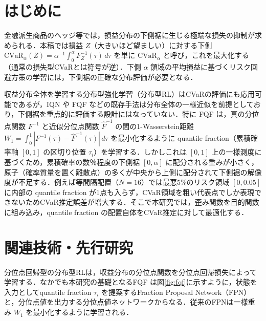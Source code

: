 \documentclass[a4paper,twocolumn,10pt]{jsarticle}
\newcommand{\CVaR}{\mathrm{CVaR}}
\begin{document}

\section{はじめに}
金融派生商品のヘッジ等では，損益分布の下側裾に生じる極端な損失の抑制が求められる．本稿では損益 $Z$（大きいほど望ましい）に対する下側 $\CVaR_\alpha(Z) = \alpha^{-1}\int_0^\alpha F_Z^{-1}(\tau)\,d\tau$ \cite{rockafellar} を単に $\CVaR_\alpha$ と呼び，これを最大化する（通常の損失型CVaRとは符号が逆）．下側 $\alpha$ 領域の平均損益に基づくリスク回避方策の学習には，下側裾の正確な分布評価が必要となる．

収益分布全体を学習する分布型強化学習（分布型RL）はCVaRの評価にも応用可能であるが，IQN \cite{iqn} や FQF \cite{fqf} などの既存手法は分布全体の一様近似を前提としており，下側裾を重点的に評価する設計にはなっていない．特に FQF は，真の分位点関数 $F^{-1}$ と近似分位点関数 $\hat F^{-1}$ の間の1-Wasserstein距離 $W_1 = \int_0^1 |F^{-1}(\tau) - \hat F^{-1}(\tau)|\,d\tau$ を最小化するように quantile fraction（累積確率軸 $[0, 1]$ の区切り位置 $\tau_i$）を学習する．しかしこれは $[0,1]$ 上の一様測度に基づくため，累積確率の数％程度の下側裾 $[0, \alpha]$ に配分される重みが小さく，原子（確率質量を置く離散点）の多くが中央から上側に配分されて下側裾の解像度が不足する．例えば等間隔配置（$N=16$）では最悪5\%のリスク領域 $[0, 0.05]$ に内部の quantile fraction が1点も入らず，CVaR領域を粗い代表点でしか表現できないためCVaR推定誤差が増大する．そこで本研究では，歪み関数を目的関数に組み込み，quantile fraction の配置自体をCVaR推定に対して最適化する．

\section{関連技術・先行研究}
分位点回帰型の分布型RLは，収益分布の分位点関数を分位点回帰損失によって学習する．なかでも本研究の基礎となるFQF \cite{fqf} は図\ref{fig:fqf}に示すように，状態を入力としてquantile fraction $\tau_i$ を提案するFraction Proposal Network（FPN）と，分位点値を出力する分位点値ネットワークからなる．従来のFPNは一様重み $W_1$ を最小化するように学習される．
\end{document}
